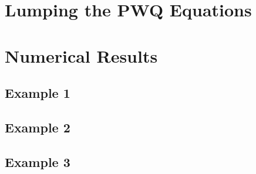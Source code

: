 \documentclass[preprint,review,10pt]{elsarticle}
\begin{document}
\section{Lumping the PWQ Equations} \label{sec::Lumping}




\section{Numerical Results} \label{sec::results}

\subsection{Example 1} \label{sec::results_E1}

\subsection{Example 2} \label{sec::results_E2}

\subsection{Example 3} \label{sec::results_E3}

\end{document}
